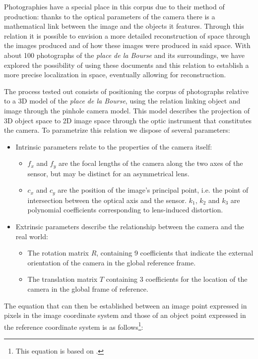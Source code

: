 \documentclass[12pt, a4paper, twocolumn]{article}
\begin{document}
Photographies have a special place in this corpus due to their method of production: thanks to the optical parameters of the camera there is a mathematical link between the image and the objects it features. Through this relation it is possible to envision a more detailed reconstruction of space through the images produced and of how these images were produced in said space. With about 100 photographs of the \textit{place de la Bourse} and its surroundings, we have explored the possibility of using these documents and this relation to establish a more precise localization in space, eventually allowing for reconstruction.

The process tested out consists of positioning the corpus of photographs relative to a 3D model of the \textit{place de la Bourse}, using the relation linking object and image through the pinhole camera model. This model describes the projection of 3D object space to 2D image space through the optic instrument that constitutes the camera. To parametrize this relation we dispose of several parameters:

\begin{itemize}
    \item Intrinsic parameters relate to the properties of the camera itself: \begin{itemize}
        \item $f_x$ and $f_y$ are the focal lengths of the camera along the two axes of the sensor, but may be distinct for an asymmetrical lens.
        \item $c_x$ and $c_y$ are the position of the image's principal point, i.e. the point of intersection between the optical axis and the sensor.
        $k_1$, $k_2$ and $k_3$ are polynomial coefficients corresponding to lens-induced distortion.
    \end{itemize}
    \item Extrinsic parameters describe the relationship between the camera and the real world: \begin{itemize}
        \item The rotation matrix $R$, containing 9 coefficients that indicate the external orientation of the camera in the global reference frame.
        \item The translation matrix $T$ containing 3 coefficients for the location of the camera in the global frame of reference.
    \end{itemize}
\end{itemize}

The equation that can then be established between an image point expressed in pixels in the image coordinate system and those of an object point expressed in the reference coordinate system is as follows\footnote{
    This equation is based on \cite{majumderCameraCalibration}. 
}: 
\end{document}
